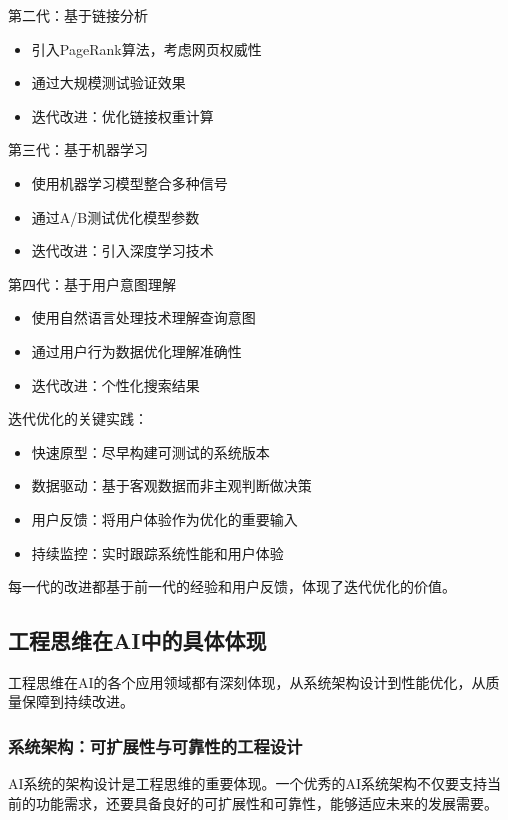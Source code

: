 第二代：基于链接分析
\begin{itemize}
\item 引入PageRank算法，考虑网页权威性
\item 通过大规模测试验证效果
\item 迭代改进：优化链接权重计算
\end{itemize}

第三代：基于机器学习
\begin{itemize}
\item 使用机器学习模型整合多种信号
\item 通过A/B测试优化模型参数
\item 迭代改进：引入深度学习技术
\end{itemize}

第四代：基于用户意图理解
\begin{itemize}
\item 使用自然语言处理技术理解查询意图
\item 通过用户行为数据优化理解准确性
\item 迭代改进：个性化搜索结果
\end{itemize}

迭代优化的关键实践：
\begin{itemize}
\item 快速原型：尽早构建可测试的系统版本
\item 数据驱动：基于客观数据而非主观判断做决策
\item 用户反馈：将用户体验作为优化的重要输入
\item 持续监控：实时跟踪系统性能和用户体验
\end{itemize}

每一代的改进都基于前一代的经验和用户反馈，体现了迭代优化的价值。

\subsection{工程思维在AI中的具体体现}
 工程思维在AI的各个应用领域都有深刻体现，从系统架构设计到性能优化，从质量保障到持续改进。
 
\subsubsection{系统架构：可扩展性与可靠性的工程设计}

AI系统的架构设计是工程思维的重要体现。一个优秀的AI系统架构不仅要支持当前的功能需求，还要具备良好的可扩展性和可靠性，能够适应未来的发展需要。

